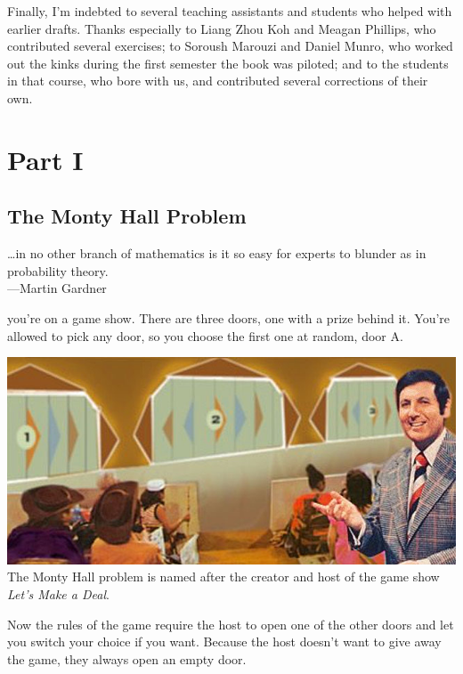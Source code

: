 \documentclass[justified]{tufte-book}
\newenvironment{epigraph}%
{
\begin{flushright}    
\begin{minipage}{20em}
\begin{flushright}
\itshape
}%
{
\end{flushright}
\end{minipage}
\end{flushright}
}
\theoremstyle{definition}
\theoremstyle{definition}
\theoremstyle{definition}
\theoremstyle{remark}
\begin{document}
Finally, I'm indebted to several teaching assistants and students who
helped with earlier drafts. Thanks especially to Liang Zhou Koh and
Meagan Phillips, who contributed several exercises; to Soroush Marouzi
and Daniel Munro, who worked out the kinks during the first semester the
book was piloted; and to the students in that course, who bore with us,
and contributed several corrections of their own.

\hypertarget{part-part-i}{%
\part*{Part I}\label{part-part-i}}

\hypertarget{the-monty-hall-problem}{%
\chapter{The Monty Hall Problem}\label{the-monty-hall-problem}}

\begin{epigraph}
\ldots{}in no other branch of mathematics is it so easy for experts to
blunder as in probability theory.\\
---Martin Gardner
\end{epigraph}

 you're on a game show. There are three doors, one
with a prize behind it. You're allowed to pick any door, so you choose
the first one at random, door A.

\begin{marginfigure}
\includegraphics{img/lets_make_a_deal.png} The Monty Hall problem is
named after the creator and host of the game show \emph{Let's Make a
Deal}.
\end{marginfigure}

Now the rules of the game require the host to open one of the other
doors and let you switch your choice if you want. Because the host
doesn't want to give away the game, they always open an empty door.
\end{document}
